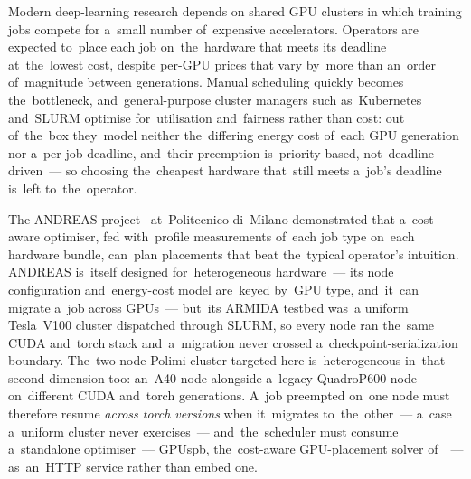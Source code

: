 Modern deep-learning research depends on shared GPU clusters in which
training jobs compete for a~small number of~expensive accelerators.
Operators are expected to~place each job on~the~hardware that meets its
deadline at~the~lowest cost, despite per-GPU prices that vary by~more
than an~order of~magnitude between generations.  Manual scheduling
quickly becomes the~bottleneck, and~general-purpose cluster managers such
as~Kubernetes and~SLURM optimise for~utilisation and~fairness rather than
cost: out of~the~box they~model neither the~differing energy cost of~each
GPU generation nor a~per-job deadline, and~their preemption is~priority-based,
not~deadline-driven~--- so choosing the~cheapest hardware that~still meets
a~job's deadline is~left to~the~operator.

The ANDREAS project~\cite{andreas} at~Politecnico di~Milano demonstrated
that a~cost-aware optimiser, fed with~profile measurements of~each job
type on~each hardware bundle, can~plan placements that beat the~typical
operator's intuition.  ANDREAS is~itself designed for~heterogeneous
hardware~--- its node configuration and~energy-cost model are~keyed by~GPU
type, and~it~can migrate a~job across GPUs~--- but~its ARMIDA testbed was~a
uniform Tesla~V100 cluster dispatched through SLURM, so every node ran the~same
CUDA and~torch stack and~a~migration never crossed a~checkpoint-serialization
boundary.  The~two-node Polimi cluster targeted here is~heterogeneous in~that
second dimension too: an~A40 node alongside a~legacy QuadroP600 node on~different
CUDA and~torch generations.  A~job preempted on~one node must therefore resume
\emph{across torch versions} when it~migrates to~the~other~--- a~case a~uniform
cluster never exercises~--- and~the~scheduler must consume a~standalone
optimiser~--- GPUspb, the~cost-aware GPU-placement solver
of~\cite{filippini2023pathrelinking,filippini2024stochastic}~--- as~an~HTTP
service rather than embed one.

